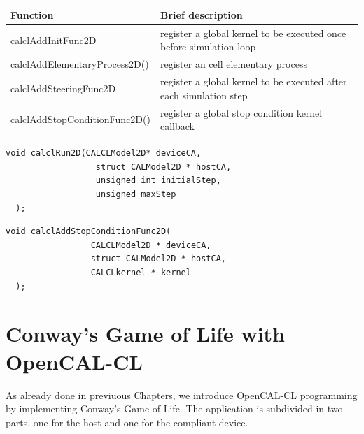 \begin{table}
  \centering
  \begin{footnotesize}
  \begin{tabular}{l|l}
    \hline
    Function & Brief description\\
    \hline
    \hline
    calclAddInitFunc2D             & register a global kernel to be executed once before simulation loop \\
    calclAddElementaryProcess2D()  & register an cell elementary process \\
    calclAddSteeringFunc2D         & register a global kernel to be executed after each simulation step \\
    calclAddStopConditionFunc2D()  & register a global stop condition kernel callback \\
    \hline
    \end{tabular}
    \end{footnotesize}
  \caption{}
  \label{tab:XXX}
\end{table} 



\begin{lstlisting}[float,floatplacement=H, label=lst:calclRun2D, caption=The calclRun2D function., numbers=none]
  void calclRun2D(CALCLModel2D* deviceCA,
                  struct CALModel2D * hostCA,
                  unsigned int initialStep,
                  unsigned maxStep
  );
\end{lstlisting}


\begin{lstlisting}[float,floatplacement=H, label=lst:calclAddStopConditionFunc2D, caption=The calclAddStopConditionFunc2D function., numbers=none]
  void calclAddStopConditionFunc2D(
                 CALCLModel2D * deviceCA,
                 struct CALModel2D * hostCA,
                 CALCLkernel * kernel
  );
\end{lstlisting}


\section{Conway's Game of Life with OpenCAL-CL}
 
As already done in previuous Chapters, we introduce OpenCAL-CL
programming by implementing Conway's Game of Life. The application is
subdivided in two parts, one for the host and one for the compliant
device.




